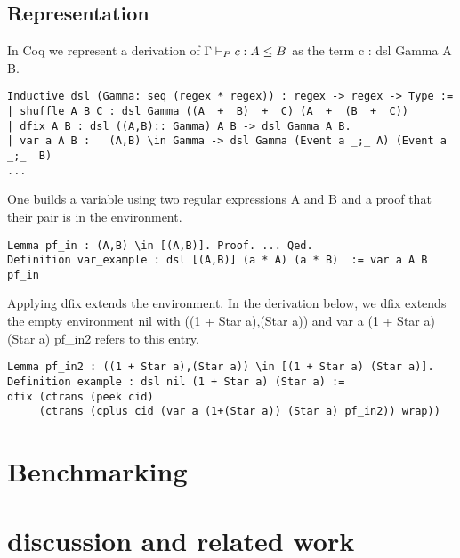 \documentclass[a4paper,UKenglish,cleveref, autoref, thm-restate]{lipics-v2021}
\newcommand\mycomment[1]{}
\begin{document}
\subsection{Representation}
In Coq we represent a derivation of $\containsG{c}{A}{B}$ as the term  \textsf{c : dsl Gamma A B}.
\mycomment{change drop to peek in code}
\begin{verbatim}
Inductive dsl (Gamma: seq (regex * regex)) : regex -> regex -> Type := 
| shuffle A B C : dsl Gamma ((A _+_ B) _+_ C) (A _+_ (B _+_ C))
| dfix A B : dsl ((A,B):: Gamma) A B -> dsl Gamma A B.
| var a A B :   (A,B) \in Gamma -> dsl Gamma (Event a _;_ A) (Event a _;_  B) 
...
\end{verbatim}
One builds a variable using two regular expressions \textsf{A} and \textsf{B} and a proof that their pair is in the environment. 
\begin{verbatim}
Lemma pf_in : (A,B) \in [(A,B)]. Proof. ... Qed.
Definition var_example : dsl [(A,B)] (a * A) (a * B)  := var a A B pf_in
\end{verbatim}
Applying \textsf{dfix} extends the environment. In the derivation below, we \textsf{dfix} extends the empty environment \textsf{nil} with \textsf{((1 + Star a),(Star a))} and \textsf{var a (1 + Star a) (Star a) pf\_in2} refers to this entry.
\begin{verbatim}
Lemma pf_in2 : ((1 + Star a),(Star a)) \in [(1 + Star a) (Star a)].
Definition example : dsl nil (1 + Star a) (Star a) := 
dfix (ctrans (peek cid)
     (ctrans (cplus cid (var a (1+(Star a)) (Star a) pf_in2)) wrap))
\end{verbatim}





\section{Benchmarking}

\section{discussion and related work}

\end{document}
